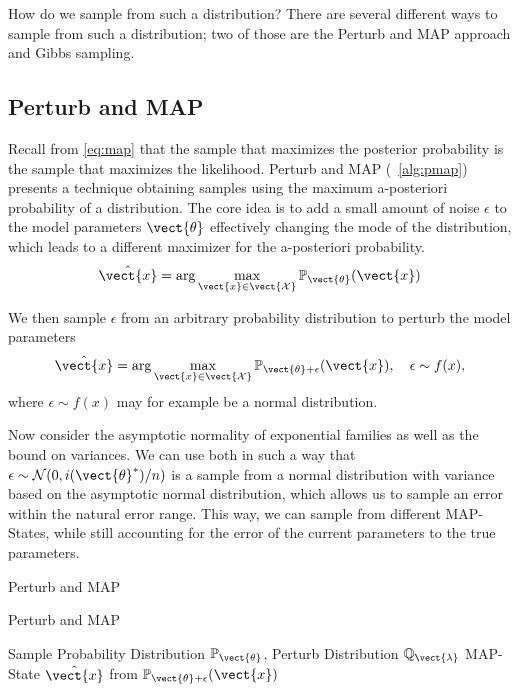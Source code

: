 How do we sample from such a distribution? There are several different ways to sample from such a distribution; two of those are the Perturb and MAP approach and Gibbs sampling.


\subsection{Perturb and MAP}
\label{ssec:pmap}
Recall from \eq\ref{eq:map} that the sample that maximizes the posterior probability is the sample that maximizes the likelihood.
Perturb and MAP (\alg~\ref{alg:pmap}) presents a technique obtaining samples using the maximum a-posteriori probability of a distribution.
The core idea is to add a small amount of noise $\epsilon$ to the model parameters $\vect{\theta}$ effectively changing the mode of the distribution, which leads to a different maximizer for the a-posteriori probability. 
\begin{equation}
    \hat{\vect{x}}  = \arg\max_{\vect{x} \in \vect{\mathcal{X}}} \mathbb{P}_{\vect{\theta}}(\vect{x})
\end{equation}

We then sample $\epsilon$ from an arbitrary probability distribution to perturb the model parameters
\begin{equation}
    \hat{\vect{x}}  = \arg\max_{\vect{x} \in \vect{\mathcal{X}}} \mathbb{P}_{\vect{\theta} + \epsilon}(\vect{x}), \quad \epsilon \sim f(x),
\end{equation}
where $\epsilon \sim f(x)$ may for example be a normal distribution.

Now consider the asymptotic normality of exponential families as well as the bound on variances. 
We can use both in such a way that $\epsilon\sim \mathcal{N}(0, i(\vect{\theta}^*)/n)$ is a sample from a normal distribution with variance based on the asymptotic normal distribution, which allows us to sample an error within the natural error range.
This way, we can sample from different MAP-States, while still accounting for the error of the current parameters \wrt to the true parameters.


\begin{algo}{Perturb and MAP~\cite{papandreou2011perturb}}
    \begin{algorithm}[H]
        \caption{Perturb and MAP}
        \begin{algorithmic}[1]
            \label{alg:pmap}
            \REQUIRE Sample Probability Distribution $\mathbb{P}_{\vect{\theta}}$, Perturb Distribution $\mathbb{Q}_{\vect{\lambda}}$
            \ENSURE  MAP-State $\hat{\vect{x}}$ from $\mathbb{P}_{\vect{\theta} + \epsilon}(\vect{x})$ \\
            \\
            \\
        \end{algorithmic}
    \end{algorithm}
\end{algo}

